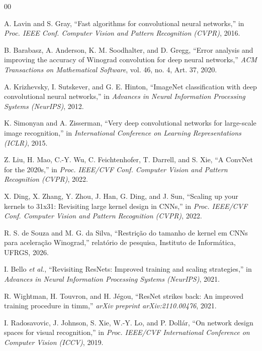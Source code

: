 \documentclass[conference]{IEEEtran}
\begin{document}
\renewcommand{\refname}{Referências}
\begin{thebibliography}{00}

A. Lavin and S. Gray, ``Fast algorithms for convolutional neural networks,'' in \textit{Proc. IEEE Conf. Computer Vision and Pattern Recognition (CVPR)}, 2016.

B. Barabasz, A. Anderson, K. M. Soodhalter, and D. Gregg, ``Error analysis and improving the accuracy of Winograd convolution for deep neural networks,'' \textit{ACM Transactions on Mathematical Software}, vol. 46, no. 4, Art. 37, 2020.

A. Krizhevsky, I. Sutskever, and G. E. Hinton, ``ImageNet classification with deep convolutional neural networks,'' in \textit{Advances in Neural Information Processing Systems (NeurIPS)}, 2012.

K. Simonyan and A. Zisserman, ``Very deep convolutional networks for large-scale image recognition,'' in \textit{International Conference on Learning Representations (ICLR)}, 2015.

Z. Liu, H. Mao, C.-Y. Wu, C. Feichtenhofer, T. Darrell, and S. Xie, ``A ConvNet for the 2020s,'' in \textit{Proc. IEEE/CVF Conf. Computer Vision and Pattern Recognition (CVPR)}, 2022.

X. Ding, X. Zhang, Y. Zhou, J. Han, G. Ding, and J. Sun, ``Scaling up your kernels to 31x31: Revisiting large kernel design in CNNs,'' in \textit{Proc. IEEE/CVF Conf. Computer Vision and Pattern Recognition (CVPR)}, 2022.

R. S. de Souza and M. G. da Silva, ``Restrição do tamanho de kernel em CNNs para aceleração Winograd,'' relatório de pesquisa, Instituto de Informática, UFRGS, 2026.

I. Bello \textit{et al.}, ``Revisiting ResNets: Improved training and scaling strategies,'' in \textit{Advances in Neural Information Processing Systems (NeurIPS)}, 2021.

R. Wightman, H. Touvron, and H. Jégou, ``ResNet strikes back: An improved training procedure in timm,'' \textit{arXiv preprint arXiv:2110.00476}, 2021.

I. Radosavovic, J. Johnson, S. Xie, W.-Y. Lo, and P. Dollár, ``On network design spaces for visual recognition,'' in \textit{Proc. IEEE/CVF International Conference on Computer Vision (ICCV)}, 2019.


\end{thebibliography}
\end{document}
